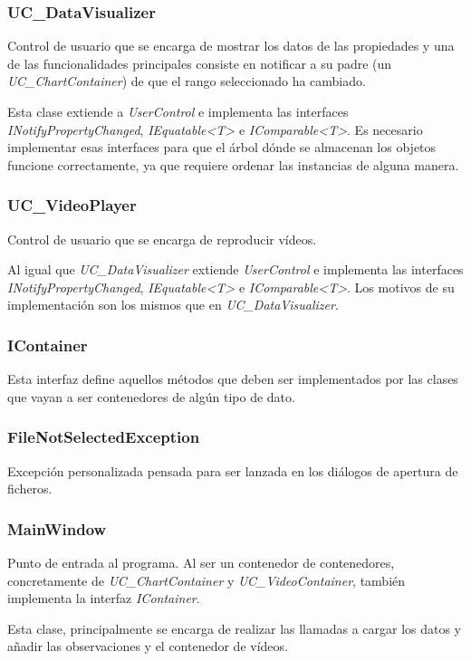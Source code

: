 \subsubsection{UC\_DataVisualizer}
Control de usuario que se encarga de mostrar los datos de las propiedades y una de las funcionalidades
principales consiste en notificar a su padre (un \emph{UC\_ChartContainer}) de que el rango seleccionado ha cambiado.

Esta clase extiende a \emph{UserControl} e implementa las interfaces \emph{INotifyPropertyChanged},
\emph{IEquatable<T>} e \emph{IComparable<T>}. Es necesario implementar
esas interfaces para que el \'arbol d\'onde se almacenan los objetos funcione correctamente, ya que 
requiere ordenar las instancias
de alguna manera. 

\subsubsection{UC\_VideoPlayer}
Control de usuario que se encarga de reproducir v\'ideos.

Al igual que \emph{UC\_DataVisualizer} extiende \emph{UserControl} 
e implementa las interfaces \emph{INotifyPropertyChanged},
\emph{IEquatable<T>} e \emph{IComparable<T>}. Los motivos de su implementaci\'on
son los mismos que en \emph{UC\_DataVisualizer}.

\subsubsection{IContainer}
Esta interfaz define aquellos m\'etodos que deben ser implementados por las clases que vayan a ser contenedores
de alg\'un tipo de dato.

\subsubsection{FileNotSelectedException}
Excepci\'on personalizada pensada para ser lanzada en los di\'alogos de apertura de ficheros.

\subsubsection{MainWindow}
Punto de entrada al programa. Al ser un contenedor de contenedores, concretamente de \emph{UC\_ChartContainer} y
\emph{UC\_VideoContainer}, tambi\'en implementa la interfaz \emph{IContainer}.

Esta clase, principalmente se encarga de realizar las llamadas a cargar los datos y añadir las observaciones
y el contenedor de v\'ideos.